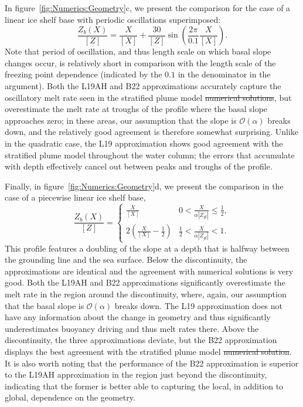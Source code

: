 \documentclass[openacc]{rsproca_new}%
\newcommand{\order}[1]{\mathcal{O}(#1)}
\newcommand{\red}[1]{{\color{red} #1}}
\newcommand{\blue}[1]{{\color{blue} #1}}
\newcommand{\rout}[1]{\red{\st{#1}}}\newcommand{\ab}[1]{\textcolor{Green}{#1}}\newcommand{\about}[1]{\textcolor{Cyan}{\sout{#1}}}
\begin{document}
In figure~\ref{fig:Numerics:Geometry}c, we present the comparison for the case of a linear ice shelf base with periodic oscillations superimposed:
\begin{equation}\label{E:Numerics:SinusoidalGeometry}
\frac{Z_b(X)}{\left[Z\right]}= \frac{X}{\left[X\right]} + \frac{30}{\left[Z\right]}\sin\left(\frac{2\pi}{0.1}\frac{ X}{\left[X\right]}\right).
\end{equation}
Note that period of oscillation, and thus length scale on which basal slope changes occur, is relatively short in comparison with the length scale of the freezing point dependence (indicated by the $0.1$ in the denominator in the argument). Both the L19AH and B22 approximations accurately capture the oscillatory melt rate seen in \blue{the stratified plume model}\rout{ numerical solutions}, but overestimate the melt rate at troughs of the profile where the basal slope approaches zero; in these areas, our assumption that the slope is $\order{\alpha}$ breaks down, and the relatively good agreement is therefore somewhat surprising. Unlike in the quadratic case, the L19 approximation shows good agreement \blue{with the stratified plume model} throughout the water column; the errors that accumulate with depth effectively cancel out between peaks and troughs of the profile.  

Finally, in figure~\ref{fig:Numerics:Geometry}d, we present the comparison in the case of a piecewise linear ice shelf base,
\begin{equation}\label{E:Numerics:PiecewiseGeometry}
\frac{Z_b(X)}{\left[Z\right]} = \begin{cases}
  \frac{X}{\left[X\right]}  & 0 <   \frac{X}{\alpha |Z_{gl}|} \leq   \frac{1}{2},\\
   2 \left(\frac{X}{\left[X\right]} -\frac{1}{2}\right)  &  \frac{1}{2} <   \frac{X}{\alpha |Z_{gl}|} <   1.
    \end{cases}
\end{equation}
This profile features a doubling of the slope at a depth that is halfway between the grounding line and the sea surface. Below the discontinuity, the approximations are identical and the agreement with numerical solutions is very good. Both the L19AH and B22 approximations significantly overestimate the melt rate in the region around the discontinuity, where, again, our assumption that the basal slope is $\order{\alpha}$ breaks down. The L19 approximation does not have any information about the change in geometry and thus significantly underestimates buoyancy driving and thus melt rates there. Above the discontinuity, the three approximations deviate, but the B22 approximation displays the best agreement with the \blue{stratified plume model}\rout{ numerical solution}. It is also worth noting that the performance of the B22 approximation is superior to the L19AH approximation in the region just beyond the discontinuity, indicating that the former is better able to capturing the local, in addition to global, dependence on the geometry.
\end{document}

